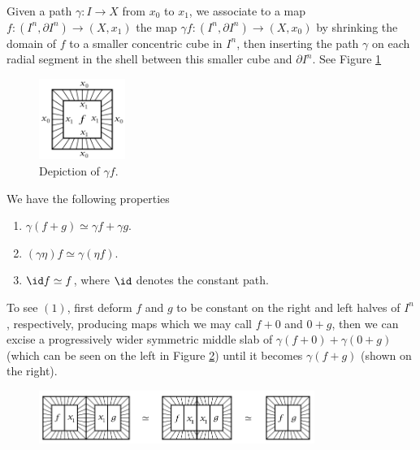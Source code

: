   \begin{definition}
      Given a path
      $\gamma \colon I \to X$ from
      $x_0$ to $x_1$, we associate to a map
      $f \colon \left( I^{n}, \partial I^{n} \right) \to 
      \left( X, x_1 \right) $ the map
      $\gamma f \colon \left( I^{n}, \partial I^{n} \right) 
      \to \left( X,x_0 \right) $ by shrinking the domain
      of $f$ to a smaller concentric cube in $I^{n}$, then
      inserting the path $\gamma$ on each radial segment
      in the shell between this smaller cube and $\partial
      I^{n}$.
      See Figure \ref{fig:JDWIXHHX011SJ-png}

      \begin{figure}[htpb]
          \centering
          \includegraphics[width=0.25\textwidth]{Figures/JDWIXHHX011SJ.png}
          \caption{Depiction of $\gamma f$.}
          \label{fig:JDWIXHHX011SJ-png}
      \end{figure}

  \begin{note}
      We have the following properties
      \begin{enumerate}
          \item $\gamma \left( f+ g \right) 
              \simeq \gamma f + \gamma g$.
          \item $\left( \gamma \eta \right) f \simeq
              \gamma \left( \eta f \right) $.
          \item $\id f \simeq f$, where
              $\id$ denotes the constant path.
      \end{enumerate}

      To see $(1)$, first deform $f$ and $g$ to be
      constant on the right and left halves of
      $I^{n}$, respectively, producing maps
      which we may call $f+0$ and $0+g$, then we 
      can excise a progressively wider symmetric middle slab
      of $\gamma (f+0) + \gamma(0+g)$ (which can be
      seen on the left in Figure \ref{fig:WIWIWSSK11-png})
      until it becomes $\gamma \left( f+g \right) $ (shown on the
      right).

      \begin{figure}[htpb]
          \centering
          \includegraphics[width=0.8\textwidth]{Figures/WIWIWSSK11.png}
          \caption{}
          \label{fig:WIWIWSSK11-png}
      \end{figure}
  \end{note}


\end{definition}
